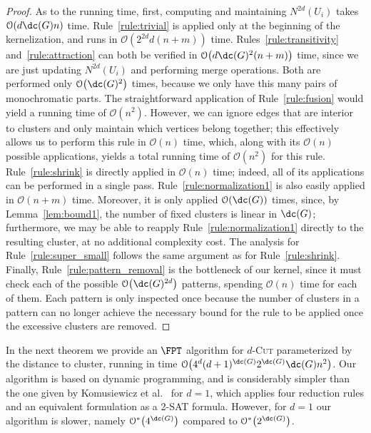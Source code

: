 \documentclass[a4paper,UKenglish,cleveref, autoref]{lipics-v2019}
\newcommand{\bigO}[1]{\mathcal{O}\!\left(#1\right)}
\newcommand{\bigOs}[1]{\mathcal{O}^*\!\left(#1\right)}
\begin{document}
\begin{proof}
    As to the running time, first, computing and maintaining $N^{2d}(U_i)$ takes $\bigO{d\dc(G)n}$ time.
    Rule~\ref{rule:trivial} is applied only at the beginning of the kernelization, and runs in $\bigO{2^{2d}d(n + m)}$ time.
    Rules~\ref{rule:transitivity} and~\ref{rule:attraction} can both be verified in $\bigO{d\dc(G)^2(n + m)}$ time, since we are just updating $N^{2d}(U_i)$ and performing merge operations.
    Both are performed only $\bigO{\dc(G)^2}$ times, because we only have this many pairs of monochromatic parts.
    The straightforward application of Rule~\ref{rule:fusion} would yield a running time of $\bigO{n^2}$. However, we can ignore edges that are interior to clusters and only maintain which vertices belong together; this effectively allows us to perform this rule in $\bigO{n}$ time, which, along with its $\bigO{n}$ possible applications, yields a total running time of $\bigO{n^2}$ for this rule.
    Rule~\ref{rule:shrink} is directly applied in $\bigO{n}$ time; indeed, all of its applications can be performed in a single pass.
    Rule~\ref{rule:normalization1} is also easily applied in $\bigO{n + m}$ time. Moreover, it is only applied $\bigO{\dc(G)}$ times, since, by Lemma~\ref{lem:bound1}, the number of fixed clusters is linear in $\dc(G)$; furthermore, we may be able to reapply Rule~\ref{rule:normalization1} directly to the resulting cluster, at no additional complexity cost.
    The analysis for Rule~\ref{rule:super_small} follows the same argument as for Rule~\ref{rule:shrink}.
    Finally, Rule~\ref{rule:pattern_removal} is the bottleneck of our kernel, since it must check each of the possible $\bigO{\dc(G)^{2d}}$ patterns, spending $\bigO{n}$ time for each of them.
    Each pattern is only inspected once because the number of clusters in a pattern can no longer achieve the necessary bound for the rule to be applied once the excessive clusters are removed.
\end{proof}

In the next theorem we provide an $\FPT$ algorithm for \textsc{$d$-Cut} parameterized by the distance to cluster, running in time $\bigO{4^d(d+1)^{\dc(G)}2^{\dc(G)}\dc(G)n^2}$. Our algorithm is based on dynamic programming, and is considerably simpler than the one given by Komusiewicz  et al.~\cite{matching_cut_ipec} for $d=1$, which applies four reduction rules and an equivalent formulation as a 2-\textsc{SAT} formula. However, for $d=1$ our algorithm is slower, namely $\bigOs{4^{\dc( G )}}$ compared to  $\bigOs{2^{\dc( G )}}$.


\end{document}
